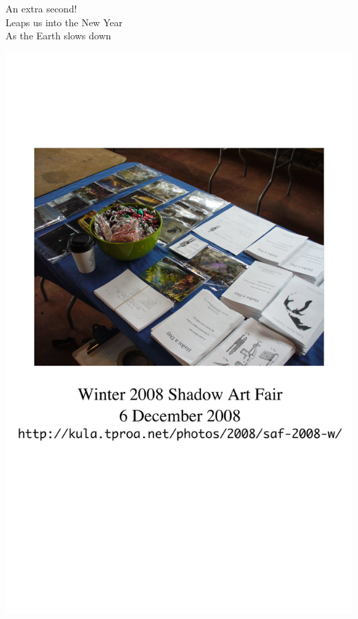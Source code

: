 \documentclass[12pt]{article}
\begin{document}
An extra second! \\
Leaps us into the New Year \\
As the Earth slows down


\newpage

\includegraphics{back.png}

\newpage
\end{document}
